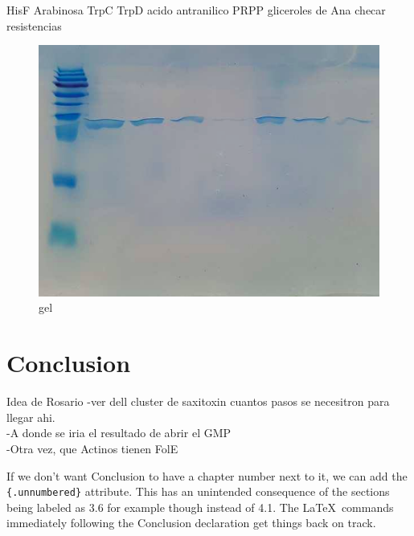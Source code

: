 \documentclass[12pt,twoside]{reedthesis}
\begin{document}
  HisF Arabinosa TrpC TrpD acido antranilico PRPP gliceroles de Ana checar
  resistencias
  
  \begin{figure}[h!tbp]
  \centering
  \includegraphics[angle = 0,scale = 0.6]{chapter4/Geles/PriAAbril30.png}
  \caption[gel]{\normalsize{gel}}
  \label{fig:gel}
  \end{figure}
  
  \begin{Shaded}
  \begin{Highlighting}[]
  \end{Highlighting}
  \end{Shaded}
  
  \chapter*{Conclusion}\label{conclusion}
  
  \setcounter{chapter}{4} \setcounter{section}{0}
  
  Idea de Rosario -ver dell cluster de saxitoxin cuantos pasos se
  necesitron para llegar ahi.\\
  -A donde se iria el resultado de abrir el GMP\\
  -Otra vez, que Actinos tienen FolE
  
  If we don't want Conclusion to have a chapter number next to it, we can
  add the \texttt{\{.unnumbered\}} attribute. This has an unintended
  consequence of the sections being labeled as 3.6 for example though
  instead of 4.1. The \LaTeX~commands immediately following the Conclusion
  declaration get things back on track.
  
\end{document}
